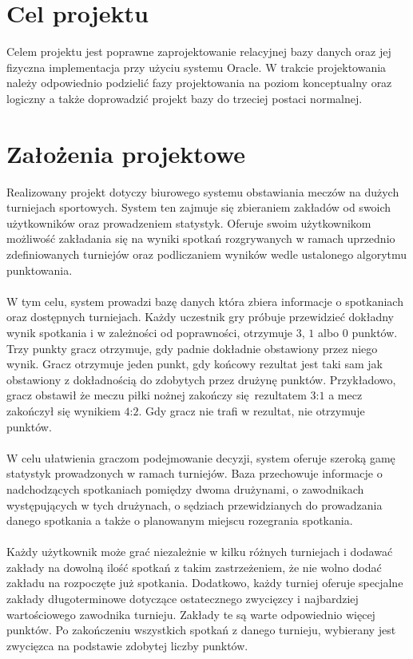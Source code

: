 \documentclass{mwrep}[15pt]
\begin{document}
\section{Cel projektu}
Celem projektu jest poprawne zaprojektowanie relacyjnej bazy danych oraz jej
fizyczna implementacja przy użyciu systemu Oracle. W trakcie projektowania należy
odpowiednio podzielić fazy projektowania na poziom konceptualny oraz logiczny a także 
doprowadzić projekt bazy do trzeciej postaci normalnej.

\section{Założenia projektowe}
Realizowany projekt dotyczy biurowego systemu obstawiania meczów
na dużych turniejach sportowych. System ten zajmuje się zbieraniem 
zakładów od swoich użytkowników oraz prowadzeniem statystyk. 
Oferuje swoim użytkownikom możliwość zakładania się na wyniki spotkań
rozgrywanych w ramach uprzednio zdefiniowanych turniejów oraz podliczaniem 
wyników wedle ustalonego algorytmu punktowania.
\\ 
\\
\indent W tym celu, system prowadzi bazę danych która zbiera informacje o spotkaniach
oraz dostępnych turniejach. Każdy uczestnik gry próbuje przewidzieć dokładny wynik 
spotkania i w zależności od poprawności, otrzymuje $3$, $1$ albo $0$ punktów.
Trzy punkty gracz otrzymuje, gdy padnie dokładnie obstawiony przez niego wynik.
Gracz otrzymuje jeden punkt, gdy końcowy rezultat jest taki sam jak obstawiony z dokładnością
do zdobytych przez drużynę punktów. Przykładowo, gracz obstawił że meczu piłki
nożnej zakończy się rezultatem $3$:$1$ a mecz zakończył się wynikiem $4$:$2$. 
Gdy gracz nie trafi w rezultat, nie otrzymuje punktów.  
\\
\\
\indent W celu ułatwienia graczom podejmowanie decyzji, system oferuje szeroką gamę statystyk 
prowadzonych w ramach turniejów. Baza przechowuje informacje o nadchodzących spotkaniach 
pomiędzy dwoma drużynami, o zawodnikach występujących w tych drużynach, o sędziach 
przewidzianych do prowadzania danego spotkania a także o planowanym miejscu rozegrania spotkania.  
\\
\\
\indent Każdy użytkownik może grać niezależnie w kilku różnych turniejach i dodawać zakłady 
na dowolną ilość spotkań z takim zastrzeżeniem, że nie wolno dodać zakładu na 
rozpoczęte już spotkania. Dodatkowo, każdy turniej oferuje specjalne zakłady długoterminowe
dotyczące ostatecznego zwycięzcy i najbardziej wartościowego zawodnika turnieju. Zakłady 
te są warte odpowiednio więcej punktów. Po zakończeniu wszystkich spotkań z danego turnieju, wybierany 
jest zwycięzca na podstawie zdobytej liczby punktów. 
\end{document}
